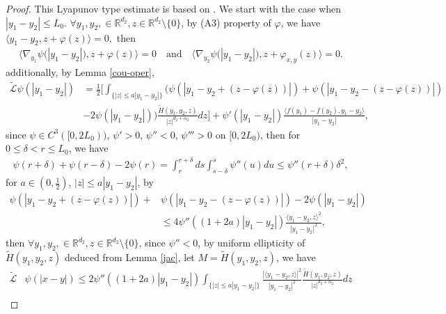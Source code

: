 \documentclass[11pt,reqno]{amsart}
\numberwithin{equation}{section}
\begin{document}
\begin{proof}
This Lyapunov type estimate is based on \cite[Proposition 3.1]{JW2}. We start with the case when $|y_1-y_2|\le L_0$. $\forall y_1,y_2,\in\mathbb{R}^{d_2}, z\in\mathbb{R}^{d_2}\setminus \{0\}$, by (A3) property of $\varphi$, we have
$
\langle y_1-y_2,z+\varphi(z)\rangle=0,
$
then
\begin{align*}
\langle\nabla_{y_1}\psi\bigl(|y_1-y_2|\bigr), z+\varphi(z)\rangle=0 \quad\mbox{and}\quad \langle\nabla_{y_2}\psi\bigl(|y_1-y_2|\bigr), z+
	\varphi_{x,y}(z)\rangle=0.
\end{align*}
additionally, by Lemma \ref{cou-oper},
\begin{align*}
\widetilde{\mathcal{L}}\psi(|y_1-y_2|)
&=\frac{1}{2} \bigg[\int_{ \{|z|\le a{|y_1-y_2|} \}} \Big(\psi (|y_1-y_2+(z-\varphi(z))| )+\psi( |y_1-y_2-(z-
	\varphi(z))|)\\
	&-2\psi(|y_1-y_2|) \Big)\frac{\widetilde{H}(y_1,y_2,z)}{|z|^{d_2+\alpha_2}}dz \bigg]+\psi'(|y_1-y_2|) \frac{\langle  f(y_1)-f(y_2),y_1-y_2\rangle }{|y_1-y_2|},
\end{align*}
since $\psi\in C^3([0,2L_0))$, $\psi'>0$,
$\psi''<0$, $\psi'''>0$ on $[0,2L_0)$, then for $0\le
\delta< r \le L_0$, we have 
\begin{align*}
\psi(r+\delta)+\psi(r-\delta)-2\psi(r)=\int_r^{r+\delta}
ds\int_{s-\delta}^s \psi''(u)
du\leq\psi''(r+\delta)\delta^2,
\end{align*}
 for $a\in(0,\frac{1}{2})$, $|z|\leq a|y_1-y_2|$, by \cite[p.1068, (3.1)]{JW2}
\begin{align*}
\psi(|y_1-y_2+(z-\varphi(z))|)+&\psi(|y_1-y_2-(z-	\varphi(z))|)-2\psi(|y_1-y_2|)\\
&\leq4\psi''((1+2a)|y_1-y_2|)\frac{\langle y_1-y_2,z\rangle ^2}{|y_1-y_2|^2},
\end{align*}
then $\forall y_1,y_2,\in\mathbb{R}^{d_2}, z\in\mathbb{R}^{d_2}\setminus \{0\}$, since $\psi''<0$, by uniform ellipticity of $\widetilde{H}(y_1,y_2,z)$ deduced from Lemma \ref{jac}, let $ M=\widetilde{H}(y_1,y_2,z)$,  we have
\begin{align}
\widetilde{\mathcal{L}}
&\psi(|x-y|)\le 2\psi''((1+2a)|y_1-y_2|)\int_{ \{|z|\le a{|y_1-y_2|} \}}\frac{|\langle y_1-y_2,z\rangle |^2}{|y_1-y_2|^2}\frac{\widetilde{H}(y_1,y_2,z)}{|z|^{d_2+\alpha_2}}dz\nonumber\\

\end{align}
\end{proof}
\end{document}
